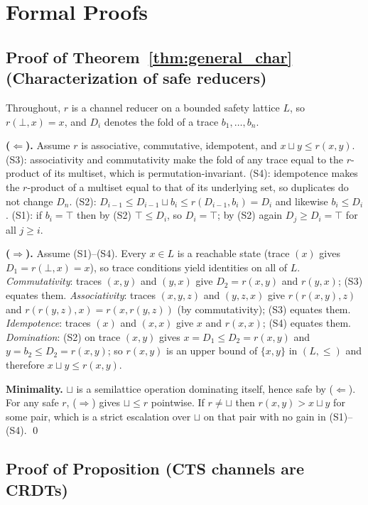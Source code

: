 \documentclass{article}
\begin{document}
\appendix

\section{Formal Proofs}

\subsection{Proof of Theorem~\ref{thm:general_char} (Characterization of safe reducers)}
\label{app:general_char}

Throughout, $r$ is a channel reducer on a bounded safety lattice $L$, so $r(\bot,x)=x$, and
$D_i$ denotes the fold of a trace $b_1,\dots,b_n$.

\textbf{($\Leftarrow$).} Assume $r$ is associative, commutative, idempotent, and $x\sqcup y\le r(x,y)$.
(S3): associativity and commutativity make the fold of any trace equal to the $r$-product of its
multiset, which is permutation-invariant. (S4): idempotence makes the $r$-product of a multiset
equal to that of its underlying set, so duplicates do not change $D_n$. (S2): $D_{i-1}\le
D_{i-1}\sqcup b_i\le r(D_{i-1},b_i)=D_i$ and likewise $b_i\le D_i$. (S1): if $b_i=\top$ then by
(S2) $\top\le D_i$, so $D_i=\top$; by (S2) again $D_j\ge D_i=\top$ for all $j\ge i$.

\textbf{($\Rightarrow$).} Assume (S1)--(S4). Every $x\in L$ is a reachable state (trace $(x)$ gives
$D_1=r(\bot,x)=x$), so trace conditions yield identities on all of $L$.
\emph{Commutativity}: traces $(x,y)$ and $(y,x)$ give $D_2=r(x,y)$ and $r(y,x)$; (S3) equates them.
\emph{Associativity}: traces $(x,y,z)$ and $(y,z,x)$ give $r(r(x,y),z)$ and $r(r(y,z),x)=r(x,r(y,z))$
(by commutativity); (S3) equates them.
\emph{Idempotence}: traces $(x)$ and $(x,x)$ give $x$ and $r(x,x)$; (S4) equates them.
\emph{Domination}: (S2) on trace $(x,y)$ gives $x=D_1\le D_2=r(x,y)$ and $y=b_2\le D_2=r(x,y)$; so
$r(x,y)$ is an upper bound of $\{x,y\}$ in $(L,\le)$ and therefore $x\sqcup y\le r(x,y)$.

\textbf{Minimality.} $\sqcup$ is a semilattice operation dominating itself, hence safe by
($\Leftarrow$). For any safe $r$, ($\Rightarrow$) gives $\sqcup\le r$ pointwise. If $r\ne\sqcup$
then $r(x,y)>x\sqcup y$ for some pair, which is a strict escalation over $\sqcup$ on that pair
with no gain in (S1)--(S4). \qed

\subsection{Proof of Proposition (CTS channels are CRDTs)}
\end{document}
